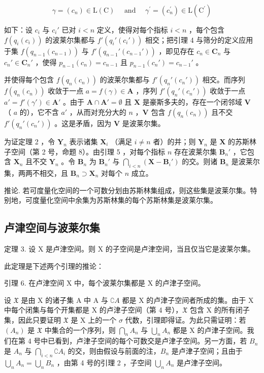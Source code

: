 \[
\gamma = (c _ {n}) \in \mathrm{L} (\mathrm{C}) \quad \text { and } \quad \gamma^ {\prime} = (c _ {n} ^ {\prime}) \in \mathrm{L} (\mathrm{C} ^ {\prime})
\]

如下：设 \(c_i\) 与 \(c_i'\) 已对 \(i < n\) 定义，使得对每个指标 \(i < n\) ，每个包含 \(f(q_i(c_i))\) 的波莱尔集都与 \(f'(q_i'(c_i'))\) 相交；把引理 4 与筛分的定义应用于集 \(f(q_{n-1}(c_{n-1}))\) 与 \(f'(q_{n-1}'(c_{n-1}'))\) ，即见存在 \(c_n \in \mathbf{C}_n\) 与 \(c_n' \in \mathbf{C}_n'\) ，使得 \(p_{n-1}(c_n) = c_{n-1}\) 且 \(p_{n-1}(c_n') = c_{n-1}'\) 。

并使得每个包含 \(f(q_n(c_n))\) 的波莱尔集都与 \(f'(q_n'(c_n'))\) 相交。而序列 \(f(q_n(c_n))\) 收敛于一点 \(a = f(\gamma) \in \mathbf{A}\) ，序列 \(f'(q_n'(c_n'))\) 收敛于一点 \(a' = f'(\gamma') \in \mathbf{A}'\) 。由于 \(\mathbf{A} \cap \mathbf{A}' = \emptyset\) 且 \(\mathbf{X}\) 是豪斯多夫的，存在一个闭邻域 \(\mathbf{V}\) （ \(a\) 的），它不含 \(a'\) ，从而对充分大的 \(n\) ，\(\mathbf{V}\) 包含 \(f(q_n(c_n))\) 且不交 \(f'(q_n'(c_n'))\) 。这是矛盾，因为 \(\mathbf{V}\) 是波莱尔集。

为证定理 2 ，令 \(\mathbf{Y}_n\) 表示诸集 \(\mathbf{X}_i\) （满足 \(i \neq n\) 者）的并；则 \(\mathbf{Y}_n\) 是 \(\mathbf{X}\) 的苏斯林子空间（第 2 号，命题 8）。由引理 5 ，对每个指标 \(n\) 存在波莱尔集 \(\mathbf{B}_n'\) ，它包含 \(\mathbf{X}_n\) 且不交 \(\mathbf{Y}_n\) 。令 \(\mathbf{B}_n\) 为 \(\mathbf{B}_n'\) 与 \(\bigcap_{i < n} (\mathbf{X} - \mathbf{B}_i')\) 的交。则诸 \(\mathbf{B}_n\) 是波莱尔集，两两不相交，且 \(\mathbf{B}_n \supset \mathbf{X}_n\) 对每个 \(n\) 成立。

推论. 若可度量化空间的一个可数分划由苏斯林集组成，则这些集是波莱尔集。特别地，可度量化空间中余集为苏斯林集的每个苏斯林集是波莱尔集。

\subsection{卢津空间与波莱尔集}

定理 3. 设 X 是卢津空间。则 X 的子空间是卢津空间，当且仅当它是波莱尔集。

此定理是下述两个引理的推论：

引理 6. 在卢津空间 X 中，每个波莱尔集都是 X 的卢津子空间。

设 \(\mathfrak{X}\) 是由 X 的诸子集 A 中 A 与 \(\complement A\) 都是 X 的卢津子空间者所成的集。由于 X 中每个闭集与每个开集都是 X 的卢津子空间（第 4 号），\(\mathfrak{X}\) 包含 X 的所有闭子集，因此只要证明 \(\mathfrak{X}\) 是 X 上的一个 \(\sigma\) 代数，引理即得证。为此只需证明：若 \((A_n)\) 是 \(\mathfrak{X}\) 中集合的一个序列，则 \(\bigcap_{n} A_n\) 与 \(\bigcup_{n} A_n\) 都是 X 的卢津子空间。我们在第 4 号中已看到，卢津子空间的每个可数交是卢津子空间。另一方面，若 \(B_n\) 是 \(A_n\) 与 \(\bigcap_{i < n} \complement A_i\) 的交，则由假设与前面的注，\(B_n\) 是卢津子空间；且由于 \(\bigcup_{n} A_n = \bigcup_{n} B_n\) ，由第 4 号的引理 2 ，子空间 \(\bigcup_{n} A_n\) 是卢津子空间。

